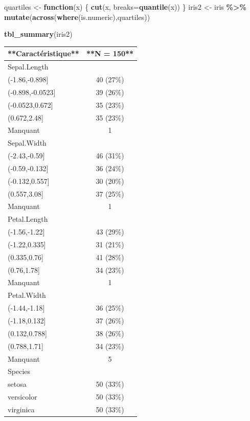 \documentclass[
]{book}
\newenvironment{Shaded}{\begin{snugshade}}{\end{snugshade}}
\newcommand{\AttributeTok}[1]{\textcolor[rgb]{0.13,0.29,0.53}{#1}}
\newcommand{\ControlFlowTok}[1]{\textcolor[rgb]{0.13,0.29,0.53}{\textbf{#1}}}
\newcommand{\FunctionTok}[1]{\textcolor[rgb]{0.13,0.29,0.53}{\textbf{#1}}}
\newcommand{\NormalTok}[1]{#1}
\newcommand{\OtherTok}[1]{\textcolor[rgb]{0.56,0.35,0.01}{#1}}
\newcommand{\SpecialCharTok}[1]{\textcolor[rgb]{0.81,0.36,0.00}{\textbf{#1}}}
\begin{document}
\begin{Shaded}
\begin{Highlighting}[]
\NormalTok{quartiles }\OtherTok{\textless{}{-}} \ControlFlowTok{function}\NormalTok{(x) \{}
  \FunctionTok{cut}\NormalTok{(x, }\AttributeTok{breaks=}\FunctionTok{quantile}\NormalTok{(x))}
\NormalTok{\}}
\NormalTok{iris2 }\OtherTok{\textless{}{-}}\NormalTok{ iris }\SpecialCharTok{\%\textgreater{}\%} \FunctionTok{mutate}\NormalTok{(}\FunctionTok{across}\NormalTok{(}\FunctionTok{where}\NormalTok{(is.numeric),quartiles))}
\end{Highlighting}
\end{Shaded}

\begin{Shaded}
\begin{Highlighting}[]
\FunctionTok{tbl\_summary}\NormalTok{(iris2)}
\end{Highlighting}
\end{Shaded}

\begin{tabular}{l|c}
\hline
**Caractéristique** & **N = 150**\\
\hline
Sepal.Length & \\
\hline
(-1.86,-0.898] & 40 (27\%)\\
\hline
(-0.898,-0.0523] & 39 (26\%)\\
\hline
(-0.0523,0.672] & 35 (23\%)\\
\hline
(0.672,2.48] & 35 (23\%)\\
\hline
Manquant & 1\\
\hline
Sepal.Width & \\
\hline
(-2.43,-0.59] & 46 (31\%)\\
\hline
(-0.59,-0.132] & 36 (24\%)\\
\hline
(-0.132,0.557] & 30 (20\%)\\
\hline
(0.557,3.08] & 37 (25\%)\\
\hline
Manquant & 1\\
\hline
Petal.Length & \\
\hline
(-1.56,-1.22] & 43 (29\%)\\
\hline
(-1.22,0.335] & 31 (21\%)\\
\hline
(0.335,0.76] & 41 (28\%)\\
\hline
(0.76,1.78] & 34 (23\%)\\
\hline
Manquant & 1\\
\hline
Petal.Width & \\
\hline
(-1.44,-1.18] & 36 (25\%)\\
\hline
(-1.18,0.132] & 37 (26\%)\\
\hline
(0.132,0.788] & 38 (26\%)\\
\hline
(0.788,1.71] & 34 (23\%)\\
\hline
Manquant & 5\\
\hline
Species & \\
\hline
setosa & 50 (33\%)\\
\hline
versicolor & 50 (33\%)\\
\hline
virginica & 50 (33\%)\\
\hline
\end{tabular}
\end{document}
